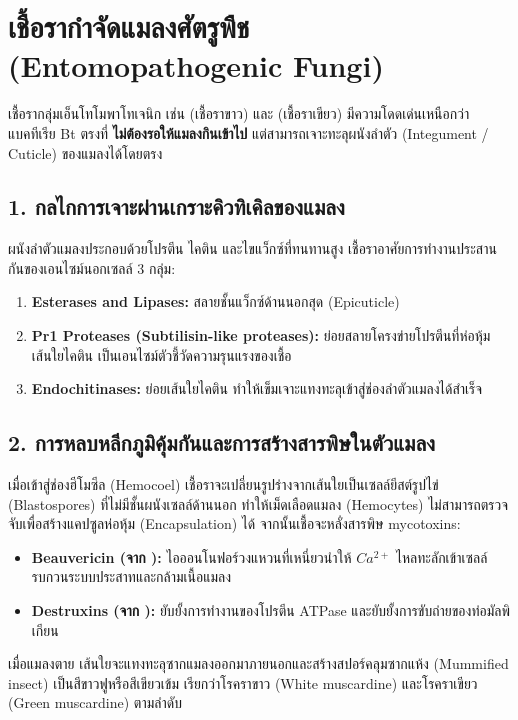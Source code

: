 \section{เชื้อรากำจัดแมลงศัตรูพืช (Entomopathogenic Fungi)}

เชื้อรากลุ่มเอ็นโทโมพาโทเจนิก เช่น  (เชื้อราขาว) และ  (เชื้อราเขียว) มีความโดดเด่นเหนือกว่าแบคทีเรีย Bt ตรงที่ \textbf{ไม่ต้องรอให้แมลงกินเข้าไป} แต่สามารถเจาะทะลุผนังลำตัว (Integument / Cuticle) ของแมลงได้โดยตรง

\subsection{1. กลไกการเจาะผ่านเกราะคิวทิเคิลของแมลง}
ผนังลำตัวแมลงประกอบด้วยโปรตีน ไคติน และไขแว็กซ์ที่ทนทานสูง เชื้อราอาศัยการทำงานประสานกันของเอนไซม์นอกเซลล์ 3 กลุ่ม:
\begin{enumerate}
    \item \textbf{Esterases and Lipases:} สลายชั้นแว็กซ์ด้านนอกสุด (Epicuticle)
    \item \textbf{Pr1 Proteases (Subtilisin-like proteases):} ย่อยสลายโครงข่ายโปรตีนที่ห่อหุ้มเส้นใยไคติน เป็นเอนไซม์ตัวชี้วัดความรุนแรงของเชื้อ
    \item \textbf{Endochitinases:} ย่อยเส้นใยไคติน ทำให้เข็มเจาะแทงทะลุเข้าสู่ช่องลำตัวแมลงได้สำเร็จ
\end{enumerate}

\subsection{2. การหลบหลีกภูมิคุ้มกันและการสร้างสารพิษในตัวแมลง}
เมื่อเข้าสู่ช่องฮีโมซีล (Hemocoel) เชื้อราจะเปลี่ยนรูปร่างจากเส้นใยเป็นเซลล์ยีสต์รูปไข่ (Blastospores) ที่ไม่มีชั้นผนังเซลล์ด้านนอก ทำให้เม็ดเลือดแมลง (Hemocytes) ไม่สามารถตรวจจับเพื่อสร้างแคปซูลห่อหุ้ม (Encapsulation) ได้ จากนั้นเชื้อจะหลั่งสารพิษ mycotoxins:
\begin{itemize}
    \item \textbf{Beauvericin (จาก ):} ไอออนโนฟอร์วงแหวนที่เหนี่ยวนำให้ $Ca^{2+}$ ไหลทะลักเข้าเซลล์ รบกวนระบบประสาทและกล้ามเนื้อแมลง
    \item \textbf{Destruxins (จาก ):} ยับยั้งการทำงานของโปรตีน ATPase และยับยั้งการขับถ่ายของท่อมัลพิเกียน
\end{itemize}
เมื่อแมลงตาย เส้นใยจะแทงทะลุซากแมลงออกมาภายนอกและสร้างสปอร์คลุมซากแห้ง (Mummified insect) เป็นสีขาวฟูหรือสีเขียวเข้ม เรียกว่าโรคราขาว (White muscardine) และโรคราเขียว (Green muscardine) ตามลำดับ

